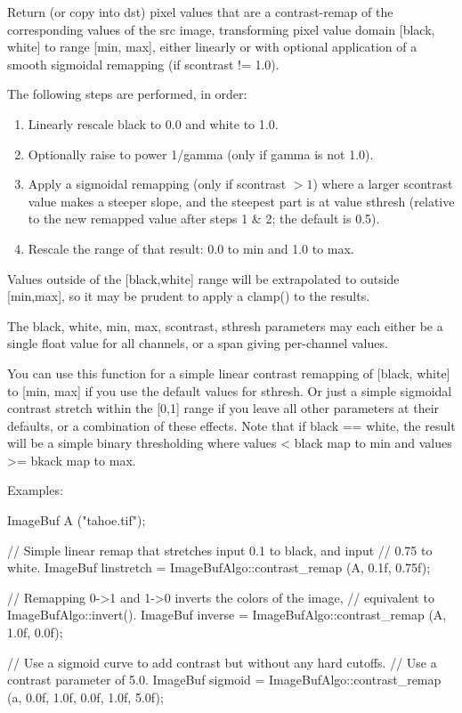 Return (or copy into {\cf dst}) pixel values that are a contrast-remap
of the corresponding values of the {\cf src} image, transforming pixel
value domain [black, white] to range [min, max], either linearly or with
optional application of a smooth sigmoidal remapping (if scontrast != 1.0).

\noindent The following steps are performed, in order:

\begin{enumerate}
\item Linearly rescale {\cf black} to 0.0 and {\cf white} to 1.0.
\item Optionally raise to power 1/gamma (only if {\cf gamma} is not 1.0).
\item Apply a sigmoidal remapping (only if {\cf scontrast} $> 1$) where a larger
   {\cf scontrast} value makes a steeper slope, and the steepest part is at
   value {\cf sthresh} (relative to the new remapped value after steps 1 \& 2;
   the default is 0.5).
\item Rescale the range of that result: 0.0 to min and 1.0 to max.
\end{enumerate}

Values outside of the [black,white] range will be extrapolated to
outside [min,max], so it may be prudent to apply a clamp() to the
results.

The black, white, min, max, scontrast, sthresh parameters may each
either be a single float value for all channels, or a span giving
per-channel values.

You can use this function for a simple linear contrast remapping of
[black, white] to [min, max] if you use the default values for sthresh.
Or just a simple sigmoidal contrast stretch within the [0,1] range if
you leave all other parameters at their defaults, or a combination of
these effects. Note that if black == white, the result will be a simple
binary thresholding where values < black map to min and values >= bkack
map to max.

\smallskip
\noindent Examples:
\begin{code}
    ImageBuf A ("tahoe.tif");

    // Simple linear remap that stretches input 0.1 to black, and input
    // 0.75 to white.
    ImageBuf linstretch = ImageBufAlgo::contrast_remap (A, 0.1f, 0.75f);

    // Remapping 0->1 and 1->0 inverts the colors of the image,
    // equivalent to ImageBufAlgo::invert().
    ImageBuf inverse = ImageBufAlgo::contrast_remap (A, 1.0f, 0.0f);

    // Use a sigmoid curve to add contrast but without any hard cutoffs.
    // Use a contrast parameter of 5.0.
    ImageBuf sigmoid = ImageBufAlgo::contrast_remap (a, 0.0f, 1.0f,
                                                     0.0f, 1.0f, 5.0f);
\end{code}

